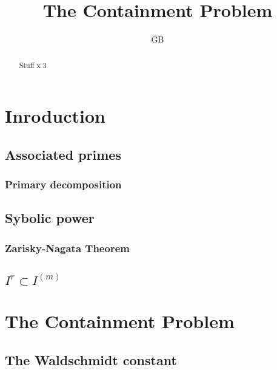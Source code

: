 \documentclass[]{article}
\title{The Containment Problem}
\author{GB}
\begin{document}
\maketitle

\begin{abstract}
	Stuff x 3
\end{abstract}

\section{Inroduction}

\subsection{Associated primes}

\subsubsection{Primary decomposition}

\subsection{Sybolic power}

\subsubsection{Zarisky-Nagata Theorem}

\subsection{$ I^r \subset I^{(m)}$ }

\section{The Containment Problem}

\subsection{The Waldschmidt constant}
\end{document}
